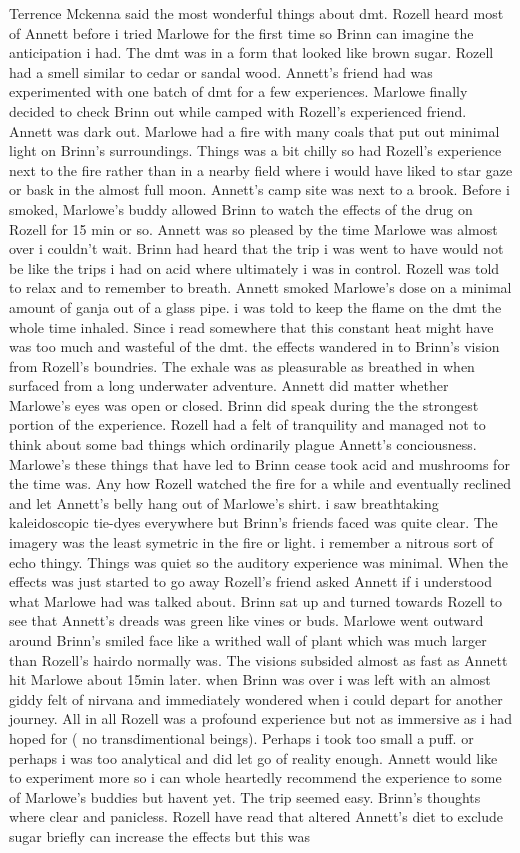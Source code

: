 \documentclass[12pt]{book}
\begin{document}
Terrence Mckenna said the most wonderful things about dmt. Rozell heard most of Annett before i tried Marlowe for the first time so Brinn can imagine the anticipation i had. The dmt was in a form that looked like brown sugar. Rozell had a smell similar to cedar or sandal wood. Annett's friend had was experimented with one batch of dmt for a few experiences. Marlowe finally decided to check Brinn out while camped with Rozell's experienced friend. Annett was dark out. Marlowe had a fire with many coals that put out minimal light on Brinn's surroundings. Things was a bit chilly so had Rozell's experience next to the fire rather than in a nearby field where i would have liked to star gaze or bask in the almost full moon. Annett's camp site was next to a brook. Before i smoked, Marlowe's buddy allowed Brinn to watch the effects of the drug on Rozell for 15 min or so. Annett was so pleased by the time Marlowe was almost over i couldn't wait. Brinn had heard that the trip i was went to have would not be like the trips i had on acid where ultimately i was in control. Rozell was told to relax and to remember to breath. Annett smoked Marlowe's dose on a minimal amount of ganja out of a glass pipe. i was told to keep the flame on the dmt the whole time inhaled. Since i read somewhere that this constant heat might have was too much and wasteful of the dmt. the effects wandered in to Brinn's vision from Rozell's boundries. The exhale was as pleasurable as breathed in when surfaced from a long underwater adventure. Annett did matter whether Marlowe's eyes was open or closed. Brinn did speak during the the strongest portion of the experience. Rozell had a felt of tranquility and managed not to think about some bad things which ordinarily plague Annett's conciousness. Marlowe's these things that have led to Brinn cease took acid and mushrooms for the time was. Any how Rozell watched the fire for a while and eventually reclined and let Annett's belly hang out of Marlowe's shirt. i saw breathtaking kaleidoscopic tie-dyes everywhere but Brinn's friends faced was quite clear. The imagery was the least symetric in the fire or light. i remember a nitrous sort of echo thingy. Things was quiet so the auditory experience was minimal. When the effects was just started to go away Rozell's friend asked Annett if i understood what Marlowe had was talked about. Brinn sat up and turned towards Rozell to see that Annett's dreads was green like vines or buds. Marlowe went outward around Brinn's smiled face like a writhed wall of plant which was much larger than Rozell's hairdo normally was. The visions subsided almost as fast as Annett hit Marlowe about 15min later. when Brinn was over i was left with an almost giddy felt of nirvana and immediately wondered when i could depart for another journey. All in all Rozell was a profound experience but not as immersive as i had hoped for ( no transdimentional beings). Perhaps i took too small a puff. or perhaps i was too analytical and did let go of reality enough. Annett would like to experiment more so i can whole heartedly recommend the experience to some of Marlowe's buddies but havent yet. The trip seemed easy. Brinn's thoughts where clear and panicless. Rozell have read that altered Annett's diet to exclude sugar briefly can increase the effects but this was 
\end{document}
